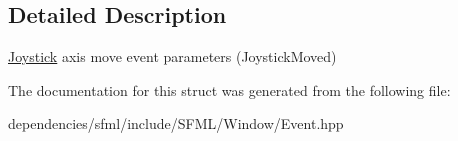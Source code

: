 \subsection{Detailed Description}
\hyperlink{classsf_1_1_joystick}{Joystick} axis move event parameters (Joystick\+Moved) 

The documentation for this struct was generated from the following file\+:\begin{DoxyCompactItemize}
\item 
dependencies/sfml/include/\+S\+F\+M\+L/\+Window/Event.\+hpp\end{DoxyCompactItemize}

